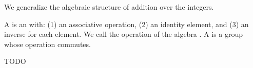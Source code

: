 
\sbasic
















\sstart
{}


We generalize the algebraic structure of
addition over the integers.


A  is an
 with:
(1) an associative operation,
(2) an identity element, and
(3) an inverse for each element.
We call the operation of the algebra
.
A 
is a group whose operation commutes.


TODO

\strats
